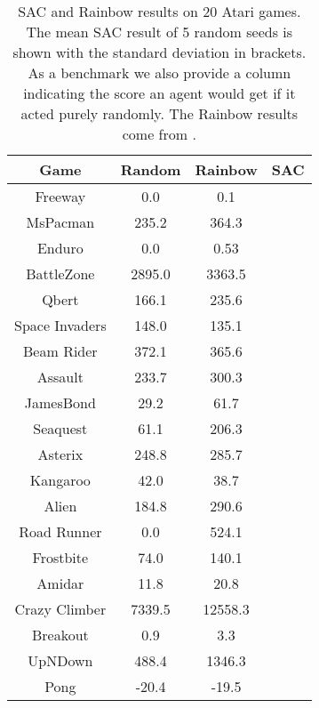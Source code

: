 \documentclass{article}
\begin{document}
\begin{table}[h]
\centering

\bgroup
\def\arraystretch{1.1}\caption{SAC and Rainbow results on 20 Atari games. The mean SAC result of 5 random seeds is shown with the standard deviation in brackets. As a benchmark we also provide a column indicating the score an agent would get if it acted purely randomly. The Rainbow results come from \cite{model-Atari}.}

\begin{tabular}{|c|c|c|c|}
\hline
\textbf{Game}  & \textbf{Random} & \textbf{Rainbow} & \textbf{SAC}     \\ \hline

Freeway        & 0.0             & 0.1              &             \\ \hline
MsPacman       & 235.2           & 364.3            &      \\ \hline
Enduro         & 0.0             & 0.53              &         \\ \hline
BattleZone          & 2895.0           & 3363.5            &    \\ \hline
Qbert          & 166.1           & 235.6            &        \\ \hline
Space Invaders & 148.0           & 135.1            &         \\ \hline
Beam Rider     & 372.1           & 365.6            &      \\ \hline
Assault          & 233.7           & 300.3            &         \\ \hline
JamesBond           & 29.2           & 61.7            &       \\ \hline
Seaquest       & 61.1            & 206.3            &            \\ \hline
Asterix        & 248.8           & 285.7            &      \\ \hline
Kangaroo        & 42.0             & 38.7              &           \\ \hline
Alien          & 184.8           & 290.6            &           \\ \hline
Road Runner    & 0.0             & 524.1            &       \\ \hline
Frostbite      & 74.0            & 140.1            &       \\ \hline
Amidar         & 11.8            & 20.8             &            \\ \hline
Crazy Climber  & 7339.5          & 12558.3          &    \\ \hline
Breakout       & 0.9             & 3.3              &              \\ \hline
UpNDown         & 488.4            & 1346.3             &          \\ \hline
Pong           & -20.4           & -19.5            &          \\ \hline


\end{tabular}
\egroup

\end{table}
\end{document}
